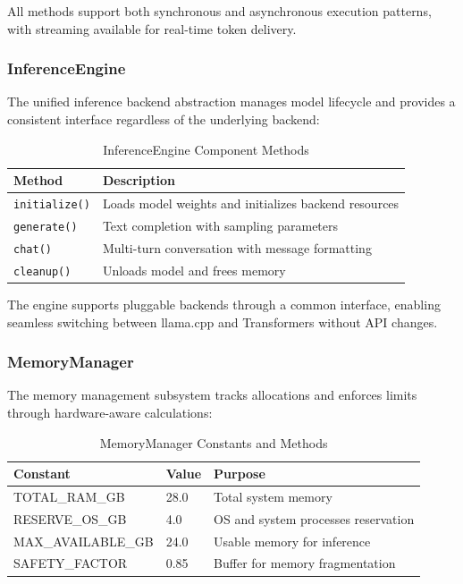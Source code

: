 All methods support both synchronous and asynchronous execution patterns, with streaming available for real-time token delivery.

\subsubsection{InferenceEngine}

The unified inference backend abstraction manages model lifecycle and provides a consistent interface regardless of the underlying backend:

\begin{table}[h]
\centering
\caption{InferenceEngine Component Methods}
\label{tab:inference_engine_api}
\begin{tabular}{lp{7cm}}
\toprule
\textbf{Method} & \textbf{Description} \\
\midrule
\texttt{initialize()} & Loads model weights and initializes backend resources \\
\texttt{generate()} & Text completion with sampling parameters \\
\texttt{chat()} & Multi-turn conversation with message formatting \\
\texttt{cleanup()} & Unloads model and frees memory \\
\bottomrule
\end{tabular}
\end{table}

The engine supports pluggable backends through a common interface, enabling seamless switching between llama.cpp and Transformers without API changes.

\subsubsection{MemoryManager}

The memory management subsystem tracks allocations and enforces limits through hardware-aware calculations:

\begin{table}[h]
\centering
\caption{MemoryManager Constants and Methods}
\label{tab:memory_manager}
\begin{tabular}{lll}
\toprule
\textbf{Constant} & \textbf{Value} & \textbf{Purpose} \\
\midrule
TOTAL\_RAM\_GB & 28.0 & Total system memory \\
RESERVE\_OS\_GB & 4.0 & OS and system processes reservation \\
MAX\_AVAILABLE\_GB & 24.0 & Usable memory for inference \\
SAFETY\_FACTOR & 0.85 & Buffer for memory fragmentation \\
\bottomrule
\end{tabular}
\end{table}

